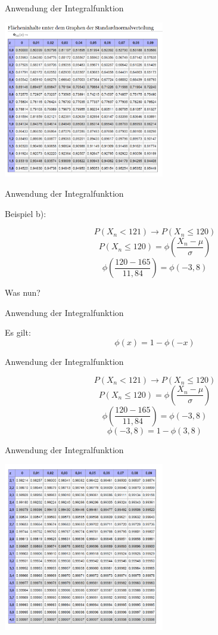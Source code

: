 \documentclass[14pt]{beamer}
\begin{document}
\begin{frame} {Anwendung der Integralfunktion}
 
 \includegraphics[width=7.0cm]{TabelleNormalverteilung.png}

\end{frame}
\begin{frame} {Anwendung der Integralfunktion}

Beispiel b):
 
 $$P(X_n < 121) \rightarrow P(X_n \le 120)$$
 $$P(X_n \le 120) =  \phi\left(\frac{X_n - \mu}{\sigma}\right)$$
 $$ \phi\left(\frac{120 - 165}{11,84}\right) = \phi(-3,8) $$
 
 Was nun?

\end{frame}
\begin{frame} {Anwendung der Integralfunktion}
 
 Es gilt:
 $$ \phi(x) = 1 - \phi(-x) $$

\end{frame}

\begin{frame} {Anwendung der Integralfunktion}
 
 $$P(X_n < 121) \rightarrow P(X_n \le 120)$$
 $$P(X_n \le 120) =  \phi\left(\frac{X_n - \mu}{\sigma}\right)$$
 $$ \phi\left(\frac{120 - 165}{11,84}\right) = \phi(-3,8) $$
 $$ \phi(-3,8) = 1 - \phi(3,8)$$

\end{frame}

\begin{frame} {Anwendung der Integralfunktion}

 \includegraphics[width=7.0cm]{TabelleNormalverteilung2.png}

\end{frame}
\end{document}
